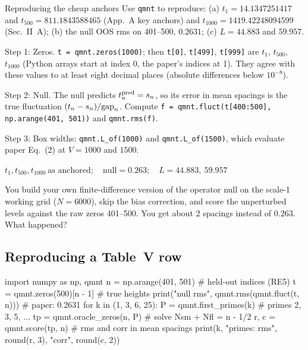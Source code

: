 \begin{sample}{Reproducing the cheap anchors}
Use \texttt{qmnt} to reproduce: (a) $t_1=14.1347251417$ and $t_{500}=811.1843588465$ (App.~A key anchors) and $t_{1000}=1419.42248094599$ (Sec.~II~A); (b) the null OOS rms on 401--500, $0.2631$; (c) $L=44.883$ and $59.957$.

Step 1: Zeros. \texttt{t = qmnt.zeros(1000)}; then \texttt{t[0]}, \texttt{t[499]}, \texttt{t[999]} are $t_1$, $t_{500}$, $t_{1000}$ (Python arrays start at index 0, the paper's indices at 1). They agree with these values to at least eight decimal places (absolute differences below $10^{-8}$).

Step 2: Null. The null predicts $t^{\rm pred}_n=s_n$, so its error in mean spacings is the true fluctuation $(t_n-s_n)/\mathrm{gap}_n$. Compute \texttt{f = qmnt.fluct(t[400:500], np.arange(401, 501))} and \texttt{qmnt.rms(f)}.

Step 3: Box widths: \texttt{qmnt.L\_of(1000)} and \texttt{qmnt.L\_of(1500)}, which evaluate paper Eq.~(2) at $V=1000$ and $1500$.

$\boxed{t_1,t_{500},t_{1000}\ \text{as anchored};\quad \text{null}=0.263;\quad L=44.883,\ 59.957}$
\end{sample}

\begin{checkpoint}
You build your own finite-difference version of the operator null on the scale-1 working grid ($N=6000$), skip the bias correction, and score the unperturbed levels against the raw zeros 401--500. You get about $2$ spacings instead of $0.263$. What happened?
\end{checkpoint}

\subsection{Reproducing a Table~V row}

\begin{pycode}
import numpy as np, qmnt
n = np.arange(401, 501)               # held-out indices (RE5)
t = qmnt.zeros(500)[n - 1]            # true heights
print("null rms", qmnt.rms(qmnt.fluct(t, n)))     # paper: 0.2631
for k in (1, 3, 6, 25):
    P = qmnt.first_primes(k)          # primes 2, 3, 5, ...
    tp = qmnt.oracle_zeros(n, P)      # solve Nsm + Nfl = n - 1/2
    r, c = qmnt.score(tp, n)          # rms and corr in mean spacings
    print(k, "primes: rms", round(r, 3), "corr", round(c, 2))
\end{pycode}

